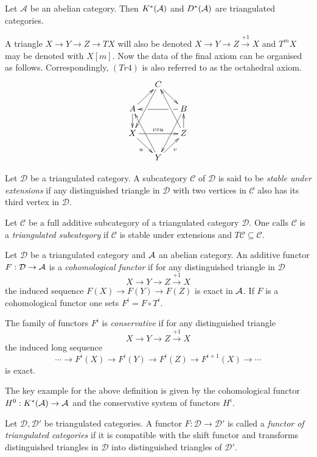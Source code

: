 \begin{proposition}{\cite[Proposition 1.2.4. ]{dimca2004sheaves}}
 Let $\mathcal{A}$ be an abelian category. Then $K^*(\AA)$ and $D^*(\AA)$ are triangulated categories.
\end{proposition}
A triangle $X\to Y \to Z \to TX$ will also be denoted $X\to Y \to Z \xrightarrow{+1} X$ and $T^m X$ may be denoted with $X[m]$.
Now the data of the final axiom can be organised as follows.
Correspondingly, $(Tr4)$ is also referred to as the octahedral axiom.
\begin{equation*}
\xymatrix@=1.6em{
& C \ar@{->}[dr] \ar[ddl] & \\
A \ar@{->}[ur] \ar[d]& &
   B\ar[ll]|(0.25)\hole|(0.75)\hole
      \ar[ddl] \\
X \ar[rr]^{v \circ u} \ar[dr]_u & &
   Z \ar[u] \ar[uul]\\
& Y \ar[ur]_v \ar[uul]&
}
\end{equation*}
\begin{definition}
 Let $\mathcal{D}$ be a triangulated category.
 A subcategory $\mathcal{C}$ of $\mathcal{D}$ is said to be {\it stable under extensions} if any distinguished triangle in $\mathcal{D}$ with two vertices in $\mathcal{C}$ also has its third vertex in $\mathcal{D}$.
\end{definition}
\begin{definition}
 Let $\mathcal{C}$ be a full additive subcategory of a triangulated category $\mathcal{D}$.
 One calls $\mathcal{C}$ is a {\it triangulated subcategory} if $\mathcal{C}$ is stable under extensions and $T\mathcal{C}\subseteq \mathcal{C}$.
\end{definition}

\begin{definition}
 Let $\mathcal{D}$ be a triangulated category and $\AA$ an abelian category.
 An additive functor $F:\mathcal{D} \to \AA$ is a {\it cohomological functor} if for any distinguished triangle in $\mathcal{D}$
 $$X \to Y \to Z\xrightarrow{+1} X $$
 the induced sequence $F(X) \to F(Y) \to F(Z) $
 is exact in $\AA$.
 If $F$ is a cohomological functor one sets $F^i = F\circ T^i$.

 The family of functors $F^i$ is {\it conservative} if for any distinguished triangle
 $$X \to Y \to Z \xrightarrow{+1} X$$
 the induced long sequence
 $$\cdots \to F^i(X) \to F^i(Y) \to F^i(Z) \to F^{i+1}(X) \to \cdots $$
 is exact.
\end{definition}
The key example for the above definition is given by the cohomological functor $H^0: K^*(\AA) \to \AA$ and the conservative system of functors $H^i$.
\begin{definition}
 Let $\mathcal{D}, \mathcal{D}'$ be triangulated categories.
 A functor $F:\mathcal{D} \to \mathcal{D}'$ is called a {\it functor of triangulated categories} if it is compatible with the shift functor and transforms distinguished triangles in $\mathcal{D}$ into distinguished triangles of $\mathcal{D}'$.
\end{definition}

